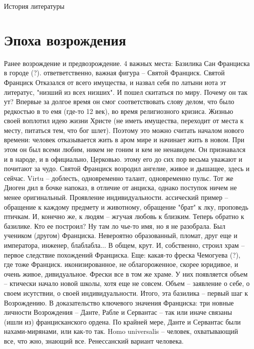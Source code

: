 



{\huge История литературы}
\section{Эпоха возрождения}
Ранее возрождение и предвозрождение. 4 важных места:
Базилика Сан Франциска в городе (?). ответветственно,   важная фигура -- Святой Франциск.
Святой Франциск
Отказался от всего имущества, и назвал себя по латыни   иота эт литератус, "низший из всех
низших". И пошел скитаться по миру. Почему он так ут?   Впервые за долгое время он смог
соответствовать слову делом, что было редкостью в то   емя (где-то 12 век), во время
религиозного кризиса. Жизнью своей воплотил идею жизни    Христе (не иметь имущества,
переходит от места к месту, питаться тем, что бог   шлет). Поэтому это можно считать
началом нового времени: человек отказывается жить в   аром мире и начинает жить в
новом. При этом он был всеми любим, никем не гоним и   кем не ненавидем. Он
признавался и в народе, и в официально, Церковью. этому   его до сих пор весьма уважают
и почитают за чудо. Святой Франциск возродил ангелие,   живое и дышащее, здесь и сейчас.
Virtu -- доблесть, одновременно талант, одновременно   пульс.
Тот же Диоген дил в бочке напоказ, в отличие от   анциска, однако поступок ничем не
менее оригинальный. Проявление индивидуальности.   ассический пример -- обращение к
каждому предмету и животному, обращение "брат" к лку,   проповедь птичкам. И, конечно
же, к людям -- жгучая любовь к близким.
Теперь обратно к базилике. Кто ее построил? Ну там ло   чье-то имя, но я не разобрала. Был
учеником (другом) Франциска. Невероятно образованный,   пломат, друг еще и императора,
инженер, блаблабла... В общем, крут. И, собственно,   строил храм -- первое следствие
похождений Франциска.
Еще: какая-то фреска Чемогуева (?), где тоже Франциск.    иконизированное, не
облагороженное, скорее юридивое, и очень живое,   дивидуальное.
Фрески все в том же храме. У них появляется объем --   ктически начало новой школы, хотя
еще не совсем. Объем -- заявление о себе, о своем   исутствии, о своей индивидуальности.
Итого, эта базилика -- первый шаг к Возрождению.
В доказательство ключевого значения Франциска: три   новные личности Возрождения --
Данте, Рабле и Сервантас -- так или иначе связаны (ишли   из) францисканского ордена. По
крайней мере, Данте и Сервантас были нахами-мирянами,   или как-то так.
Homo universalis -- человек, охватывающий все, что жно,   знающий все. Ренессанский
вариант человека.
